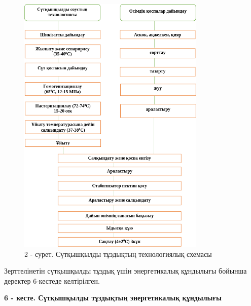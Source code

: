 \begin{figure}[H]
	\centering
	\includegraphics[width=0.8\textwidth]{media/pish2/image25}
	\caption*{2 - сурет. Сүтқышқылды тұздықтың технологиялық схемасы}
\end{figure}

Зерттелінетін сүтқышқылды тұздық үшін энергетикалық құндылығы бойынша
деректер 6-кестеде келтірілген.

{\bfseries 6 - кесте. Сүтқышқылды тұздықтың энергетикалық құндылығы}

